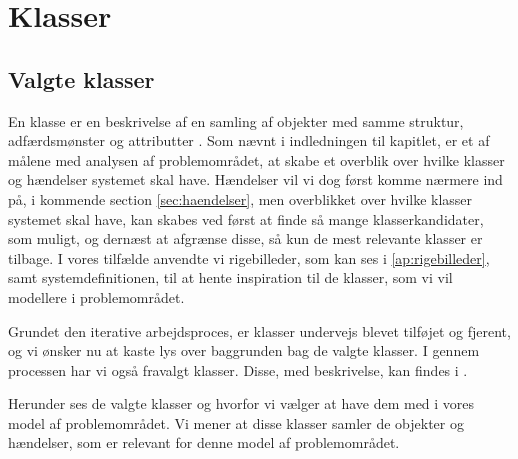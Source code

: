 \section{Klasser}
\label{sec:klasser}


\subsection{Valgte klasser}
En klasse er en beskrivelse af en samling af objekter med samme struktur, adfærdsmønster og attributter \cite[s. ~51]{ooad}. Som nævnt i indledningen til kapitlet, er et af målene med analysen af problemområdet, at skabe et overblik over hvilke klasser og hændelser systemet skal have. Hændelser vil vi dog først komme nærmere ind på, i kommende section \ref{sec:haendelser}, men overblikket over hvilke klasser systemet skal have, kan skabes ved først at finde så mange klasserkandidater, som muligt, og dernæst at afgrænse disse, så kun de mest relevante klasser er tilbage. I vores tilfælde anvendte vi rigebilleder, som kan ses i \ref{ap:rigebilleder}, samt systemdefinitionen, til at hente inspiration til de klasser, som vi vil modellere i problemområdet.

Grundet den iterative arbejdsproces, er klasser undervejs blevet tilføjet og fjerent, og vi ønsker nu at kaste lys over baggrunden bag de valgte klasser. I gennem processen har vi også fravalgt klasser. Disse, med beskrivelse, kan findes i .

Herunder ses de valgte klasser og hvorfor vi vælger at have dem med i vores model af problemområdet.
Vi mener at disse klasser samler de objekter og hændelser, som er relevant for denne model af problemområdet.

